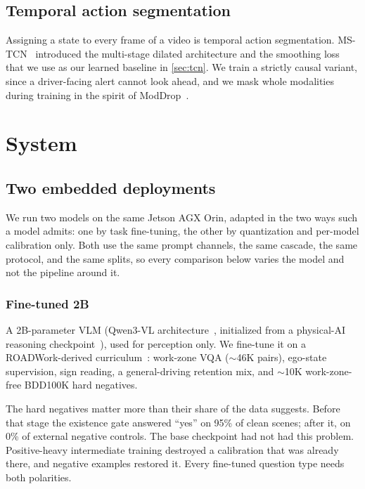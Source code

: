 \documentclass[journal]{IEEEtran}
\begin{document}
\subsection{Temporal action segmentation}
Assigning a state to every frame of a video is temporal action segmentation. MS-TCN~\cite{farha2019mstcn} introduced the multi-stage dilated architecture and the smoothing loss that we use as our learned baseline in \cref{sec:tcn}.  We train a strictly causal variant, since a driver-facing alert cannot look ahead, and we mask whole modalities during training in the spirit of ModDrop~\cite{neverova2016moddrop}.

\section{System}
\label{sec:system}

\subsection{Two embedded deployments}
\label{sec:deployment}

We run two models on the same Jetson AGX Orin, adapted in the two ways such a model admits: one by task fine-tuning, the other by quantization and per-model calibration only.  Both use the same prompt channels, the same cascade, the same protocol, and the same splits, so every comparison below varies the model and not the pipeline around it.

\subsubsection{Fine-tuned 2B}
A 2B-parameter VLM (Qwen3-VL architecture~\cite{qwen3vl}, initialized from a physical-AI reasoning checkpoint~\cite{nvidia2025cosmosreason}), used for perception only.  We fine-tune it on a ROADWork-derived curriculum~\cite{ghosh2025roadwork}: work-zone VQA ($\sim$46K pairs), ego-state supervision, sign reading, a general-driving retention mix, and $\sim$10K work-zone-free BDD100K hard negatives.

The hard negatives matter more than their share of the data suggests.  Before that stage the existence gate answered ``yes'' on 95\% of clean scenes; after it, on 0\% of external negative controls.  The base checkpoint had not had this problem.  Positive-heavy intermediate training destroyed a calibration that was already there, and negative examples restored it.  Every fine-tuned question type needs both polarities.
\end{document}
